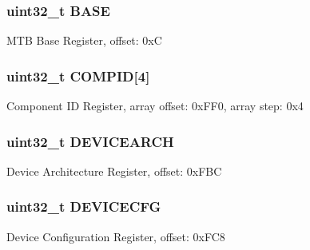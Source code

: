 \subsubsection[{B\+A\+S\+E}]{\setlength{\rightskip}{0pt plus 5cm}uint32\+\_\+t B\+A\+S\+E}\label{struct_m_t_b___mem_map_aaa2f8b529d9bf3e3bb5bab8c8b073ead}
M\+T\+B Base Register, offset\+: 0x\+C \hypertarget{struct_m_t_b___mem_map_a51d2026476b6e1547beb909d07d4aa32}{}
\subsubsection[{C\+O\+M\+P\+I\+D}]{\setlength{\rightskip}{0pt plus 5cm}uint32\+\_\+t C\+O\+M\+P\+I\+D\mbox{[}4\mbox{]}}\label{struct_m_t_b___mem_map_a51d2026476b6e1547beb909d07d4aa32}
Component I\+D Register, array offset\+: 0x\+F\+F0, array step\+: 0x4 \hypertarget{struct_m_t_b___mem_map_a457881b8a73ea9cece24db6cc5a2481b}{}
\subsubsection[{D\+E\+V\+I\+C\+E\+A\+R\+C\+H}]{\setlength{\rightskip}{0pt plus 5cm}uint32\+\_\+t D\+E\+V\+I\+C\+E\+A\+R\+C\+H}\label{struct_m_t_b___mem_map_a457881b8a73ea9cece24db6cc5a2481b}
Device Architecture Register, offset\+: 0x\+F\+B\+C \hypertarget{struct_m_t_b___mem_map_ad35a23bd184366d37228829c33d5bda6}{}
\subsubsection[{D\+E\+V\+I\+C\+E\+C\+F\+G}]{\setlength{\rightskip}{0pt plus 5cm}uint32\+\_\+t D\+E\+V\+I\+C\+E\+C\+F\+G}\label{struct_m_t_b___mem_map_ad35a23bd184366d37228829c33d5bda6}
Device Configuration Register, offset\+: 0x\+F\+C8 \hypertarget{struct_m_t_b___mem_map_aa736d6fbfbc7e051f6a2caadd4f17b8f}{}
